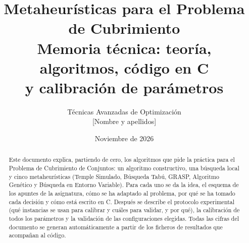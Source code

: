 \documentclass[11pt,a4paper]{article}
\title{\textbf{Metaheurísticas para el Problema de Cubrimiento}\\[4pt]
\large Memoria técnica: teoría, algoritmos, código en C\\ y calibración de parámetros}
\author{Técnicas Avanzadas de Optimización\\[2pt] {\normalsize [Nombre y apellidos]}}
\date{Noviembre de 2026}
\begin{document}
\maketitle

\begin{abstract}
\noindent Este documento explica, partiendo de cero, los algoritmos que pide la práctica para
el Problema de Cubrimiento de Conjuntos: un algoritmo constructivo, una búsqueda local y
cinco metaheurísticas (Temple Simulado, Búsqueda Tabú, GRASP, Algoritmo Genético y Búsqueda
en Entorno Variable). Para cada uno se da la idea, el esquema de los apuntes de la
asignatura, cómo se ha adaptado al problema, por qué se ha tomado cada decisión y cómo está
escrito en C. Después se describe el protocolo experimental (qué instancias se usan para
calibrar y cuáles para validar, y por qué), la calibración de todos los parámetros y la
validación de las configuraciones elegidas. Todas las cifras del documento se generan
automáticamente a partir de los ficheros de resultados que acompañan al código.
\end{abstract}

\tableofcontents
\newpage



















\appendix

\end{document}
